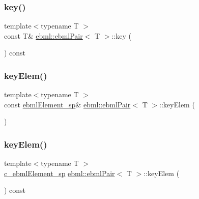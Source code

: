\mbox{\label{classebml_1_1ebmlPair_a0945a9d73fccd6913c0548c62f08c719}} 
\subsubsection{\texorpdfstring{key()}{key()}\hspace{0.1cm}{\footnotesize\ttfamily [2/2]}}
{\footnotesize\ttfamily template$<$typename T $>$ \\
const T\& \mbox{\hyperlink{classebml_1_1ebmlPair}{ebml\+::ebml\+Pair}}$<$ T $>$\+::key (\begin{DoxyParamCaption}{ }\end{DoxyParamCaption}) const}

\mbox{\label{classebml_1_1ebmlPair_a7a68c53d993ced2a13ebe81acce74855}} 
\subsubsection{\texorpdfstring{key\+Elem()}{keyElem()}\hspace{0.1cm}{\footnotesize\ttfamily [1/2]}}
{\footnotesize\ttfamily template$<$typename T $>$ \\
const \mbox{\hyperlink{namespaceebml_adad533b7705a16bb360fe56380c5e7be}{ebml\+Element\+\_\+sp}}\& \mbox{\hyperlink{classebml_1_1ebmlPair}{ebml\+::ebml\+Pair}}$<$ T $>$\+::key\+Elem (\begin{DoxyParamCaption}{ }\end{DoxyParamCaption})}

\mbox{\label{classebml_1_1ebmlPair_ac9269a9e3f807074b21db614b9f4b2ce}} 
\subsubsection{\texorpdfstring{key\+Elem()}{keyElem()}\hspace{0.1cm}{\footnotesize\ttfamily [2/2]}}
{\footnotesize\ttfamily template$<$typename T $>$ \\
\mbox{\hyperlink{namespaceebml_a2deef4e8071531b32e3533f1bf978917}{c\+\_\+ebml\+Element\+\_\+sp}} \mbox{\hyperlink{classebml_1_1ebmlPair}{ebml\+::ebml\+Pair}}$<$ T $>$\+::key\+Elem (\begin{DoxyParamCaption}{ }\end{DoxyParamCaption}) const}

